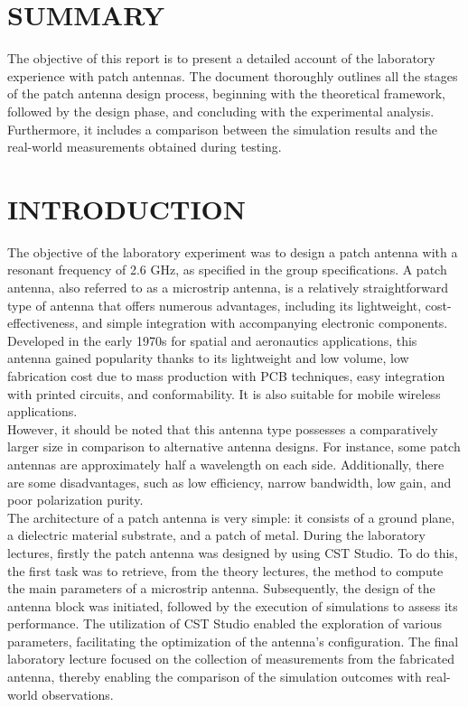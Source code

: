 \documentclass[]{article}
\begin{document}
	\section{SUMMARY}
	The objective of this report is to present a detailed account of the laboratory experience with patch antennas. The document thoroughly outlines all the stages of the patch antenna design process, beginning with the theoretical framework, followed by the design phase, and concluding with the experimental analysis. Furthermore, it includes a comparison between the simulation results and the real-world measurements obtained during testing.
	\section{INTRODUCTION}
	The objective of the laboratory experiment was to design a patch antenna with a resonant frequency of 2.6 GHz, as specified in the group specifications. A patch antenna, also referred to as a microstrip antenna, is a relatively straightforward type of antenna that offers numerous advantages, including its lightweight, cost-effectiveness, and simple integration with accompanying electronic components.\\
	Developed in the early 1970s for spatial and aeronautics applications, this antenna gained popularity thanks to its lightweight and low volume, low fabrication cost due to mass production with PCB techniques, easy integration with printed circuits, and conformability. It is also suitable for mobile wireless applications.\\
	However, it should be noted that this antenna type possesses a comparatively larger size in comparison to alternative antenna designs. For instance, some patch antennas are approximately half a wavelength on each side. Additionally, there are some disadvantages, such as low efficiency, narrow bandwidth, low gain, and poor polarization purity.\\
	The architecture of a patch antenna is very simple: it consists of a ground plane, a dielectric material substrate, and a patch of metal. During the laboratory lectures, firstly the patch antenna was designed by using CST Studio. To do this, the first task was to retrieve, from the theory lectures, the method to compute the main parameters of a microstrip antenna. Subsequently, the design of the antenna block was initiated, followed by the execution of simulations to assess its performance. The utilization of CST Studio enabled the exploration of various parameters, facilitating the optimization of the antenna's configuration. The final laboratory lecture focused on the collection of measurements from the fabricated antenna, thereby enabling the comparison of the simulation outcomes with real-world observations.
	\newpage
\end{document}
